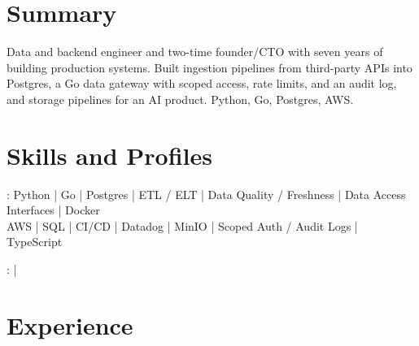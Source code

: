 \documentclass[print]{jack-resume}
\begin{document}
\pagecolor{darkmodeBackground}


\begin{minipage}[t][1cm][t]{.03\textwidth}
    \hfill
\end{minipage}

\section{Summary}
Data and backend engineer and two-time founder/CTO with seven years of building production systems. Built ingestion pipelines from third-party APIs into Postgres, a Go data gateway with scoped access, rate limits, and an audit log, and storage pipelines for an AI product. Python, Go, Postgres, AWS.
\sectionsep

\section{Skills and Profiles}
:
Python \hfill | \hfill
Go \hfill | \hfill
Postgres \hfill | \hfill
ETL / ELT \hfill | \hfill
Data Quality / Freshness \hfill | \hfill
Data Access Interfaces \hfill | \hfill
Docker \\
\hspace{1.0cm} AWS \hfill | \hfill
SQL \hfill | \hfill
CI/CD \hfill | \hfill
Datadog \hfill | \hfill
MinIO \hfill | \hfill
Scoped Auth / Audit Logs \hfill | \hfill
TypeScript \\

\raggedright{
    :
      \href{https://www.linkedin.com/in/jack-sturtevant/}{ \ExternalLink} |
     \href{https://github.com/jacksturt}{ \ExternalLink}}

\section{Experience}
\end{document}
